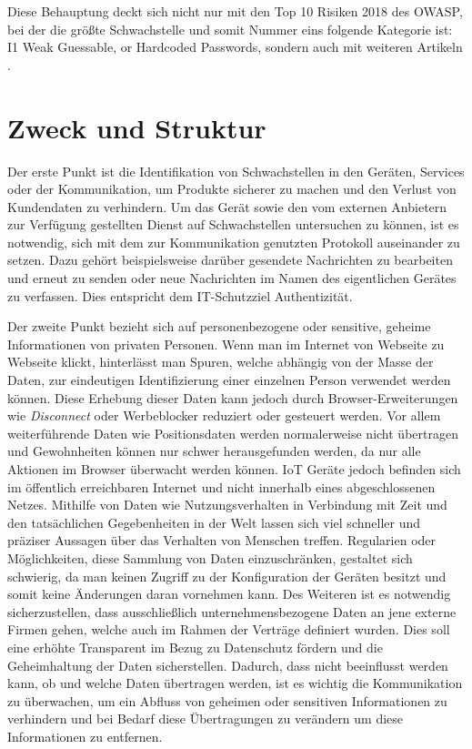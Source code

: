 Diese Behauptung deckt sich nicht nur mit den Top 10 Risiken 2018 des \ac{OWASP}, bei der die größte Schwachstelle und somit Nummer eins folgende Kategorie ist: \glqq I1 Weak Guessable, or Hardcoded Passwords\grqq{}, sondern auch mit weiteren Artikeln \cite{guzman_2019,eckstein_2018}.

\section{Zweck und Struktur}

    Der erste Punkt ist die Identifikation von Schwachstellen in den Geräten, Services oder der Kommunikation, um Produkte sicherer zu machen und den Verlust von Kundendaten zu verhindern.
    Um das Gerät sowie den vom externen Anbietern zur Verfügung gestellten Dienst auf Schwachstellen untersuchen zu können, ist es notwendig, sich mit dem zur Kommunikation genutzten Protokoll auseinander zu setzen. Dazu gehört beispielsweise darüber gesendete Nachrichten zu bearbeiten und erneut zu senden oder neue Nachrichten im Namen des eigentlichen Gerätes zu verfassen. Dies entspricht dem IT-Schutzziel Authentizität.
    
    Der zweite Punkt bezieht sich auf personenbezogene oder sensitive, geheime Informationen von privaten Personen.
    Wenn man im Internet von Webseite zu Webseite klickt, hinterlässt man Spuren, welche abhängig von der Masse der Daten, zur eindeutigen Identifizierung einer einzelnen Person verwendet werden können. %
    Diese Erhebung dieser Daten kann jedoch durch Browser-Erweiterungen wie \emph{Disconnect} oder Werbeblocker reduziert oder gesteuert werden. Vor allem weiterführende Daten wie Positionsdaten werden normalerweise nicht übertragen und Gewohnheiten können nur schwer herausgefunden werden, da nur alle Aktionen im Browser überwacht werden können.
    \ac{IoT} Geräte jedoch befinden sich im öffentlich erreichbaren Internet und nicht innerhalb eines abgeschlossenen Netzes. Mithilfe von Daten wie Nutzungsverhalten in Verbindung mit Zeit und den tatsächlichen Gegebenheiten in der Welt lassen sich viel schneller und präziser Aussagen über das Verhalten von Menschen treffen. %
    Regularien oder Möglichkeiten, diese Sammlung von Daten einzuschränken, gestaltet sich schwierig, da man keinen Zugriff zu der Konfiguration der Geräten besitzt und somit keine Änderungen daran vornehmen kann.
    Des Weiteren ist es notwendig sicherzustellen, dass ausschließlich unternehmensbezogene Daten an jene externe Firmen gehen, welche auch im Rahmen der Verträge definiert wurden. Dies soll eine erhöhte Transparent im Bezug zu Datenschutz fördern und die Geheimhaltung der Daten sicherstellen.
    Dadurch, dass nicht beeinflusst werden kann, ob und welche Daten übertragen werden, ist es wichtig die Kommunikation zu überwachen, um ein Abfluss von geheimen oder sensitiven Informationen zu verhindern und bei Bedarf diese Übertragungen zu verändern um diese Informationen zu entfernen.
    
